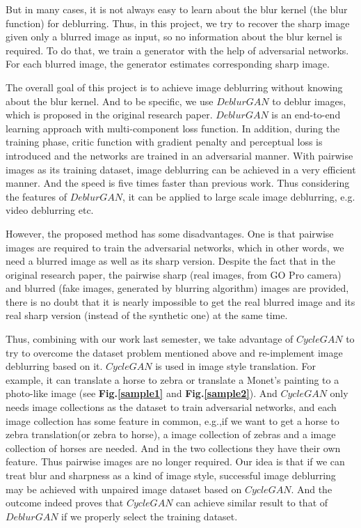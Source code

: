 \documentclass[journal]{IEEEtran}
\begin{document}
But in many cases, it is not always easy to learn about the blur kernel (the blur function) for deblurring. Thus, in this project, we try to recover the sharp image given only a blurred image as input, so no information about the blur kernel is required. To do that, we train a generator with the help of adversarial networks. For each blurred image, the generator estimates corresponding sharp image.

The overall goal of this project is to achieve image deblurring without knowing about the blur kernel. And to be specific, we use $DeblurGAN$\cite{deblurgan} to deblur images, which is proposed in the original research paper. $DeblurGAN$ is an end-to-end learning approach with multi-component loss function.  In addition, during the training phase, critic function with gradient penalty and perceptual loss is introduced and the networks are trained in an adversarial manner. With pairwise images as its training dataset, image deblurring can be achieved in a very efficient manner. And the speed is five times faster than previous work. Thus considering the features of $DeblurGAN$, it can be applied to large scale image deblurring, e.g. video deblurring etc.

However, the proposed method has some disadvantages. One is that pairwise images are required to train the adversarial networks, which in other words, we need a blurred image as well as its sharp version.  Despite the fact that in the original research paper, the pairwise sharp (real images, from GO Pro camera) and blurred (fake images, generated by blurring algorithm) images are provided, there is no doubt that it is nearly impossible to get the real blurred image and its real sharp version (instead of the synthetic one) at the same time.

Thus, combining with our work last semester, we take advantage of $CycleGAN$\cite{cyclegan} to try to overcome the dataset problem mentioned above and re-implement image deblurring based on it. $CycleGAN$ is used in image style translation. For example, it can translate a horse to zebra or translate a  Monet's painting to a photo-like image (see \textbf{Fig.\ref{sample1}} and  \textbf{Fig.\ref{sample2}}). And $CycleGAN$ only needs image collections as the dataset to train adversarial networks, and each image collection has some feature in common, e.g.,if we want to get a horse to zebra translation(or zebra to horse), a image collection of zebras and a image collection of horses are needed. And in the two collections they have their own feature. Thus pairwise images are no longer required. Our idea is that if we can treat blur and sharpness as a kind of image style, successful image deblurring may be achieved with unpaired image dataset based on $CycleGAN$. And the outcome indeed proves that $CycleGAN$ can achieve similar result to that of $DeblurGAN$ if we properly select the training dataset.
  
\end{document}
